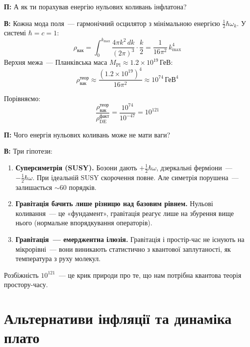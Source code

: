 \documentclass[12pt, a4paper]{article}
\newcommand{\Q}[1]{%
    \begin{questionbox}
        {\color{qcolor}\bfseries\sffamily П:} #1
    \end{questionbox}
}
\newcommand{\A}[1]{%
    \begin{answerbox}
        {\bfseries\sffamily В:} #1
    \end{answerbox}
}
\begin{document}

\Q{А як ти порахував енергію нульових коливань інфлатона?}

\A{Кожна мода поля~--- гармонічний осцилятор з мінімальною енергією $\tfrac{1}{2}\hbar\omega_k$. У системі $\hbar=c=1$:
\begin{equation}
    \rho_\text{вак} = \int_0^{k_\text{max}} \frac{4\pi k^2\,dk}{(2\pi)^3}\cdot\frac{k}{2}
    = \frac{1}{16\pi^2}\,k_\text{max}^4
\end{equation}
Верхня межа~--- Планківська маса $M_\text{Pl} \approx 1.2\times10^{19}$\,ГеВ:
\begin{equation}
    \rho_\text{вак}^\text{теор} \approx \frac{(1.2\times10^{19})^4}{16\pi^2} \approx 10^{74}\,\text{ГеВ}^4
\end{equation}

Порівняємо:
\begin{equation}
    \frac{\rho_\text{вак}^\text{теор}}{\rho_\text{DE}^\text{факт}}
    = \frac{10^{74}}{10^{-47}} = 10^{121}
\end{equation}}


\Q{Чого енергія нульових коливань може не мати ваги?}

\A{Три гіпотези:
\begin{enumerate}
    \item \textbf{Суперсиметрія (SUSY).} Бозони дають $+\tfrac{1}{2}\hbar\omega$, дзеркальні ферміони~--- $-\tfrac{1}{2}\hbar\omega$. При ідеальній SUSY скорочення повне. Але симетрія порушена~--- залишається $\sim60$ порядків.

    \item \textbf{Гравітація бачить лише різницю над базовим рівнем.} Нульові коливання~--- це «фундамент», гравітація реагує лише на збурення вище нього (нормальне впорядкування операторів).

    \item \textbf{Гравітація~--- емерджентна ілюзія.} Гравітація і простір-час не існують на мікрорівні~--- вони виникають статистично з квантової заплутаності, як температура з руху молекул.
\end{enumerate}
Розбіжність $10^{121}$~--- це крик природи про те, що нам потрібна квантова теорія простору-часу.}

\section{Альтернативи інфляції та динаміка плато}
\end{document}

